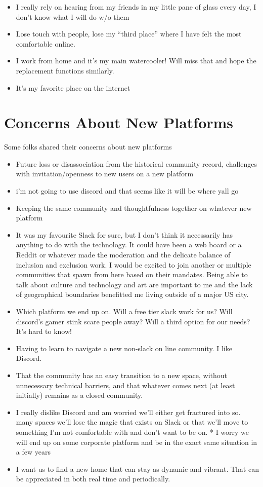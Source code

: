 \documentclass[
]{book}
\providecommand{\tightlist}{%
  \setlength{\itemsep}{0pt}\setlength{\parskip}{0pt}}
\begin{document}
\begin{itemize}
\tightlist
\item
  I really rely on hearing from my friends in my little pane of glass every day, I don't know what I will do w/o them
\item
  Lose touch with people, lose my ``third place'' where I have felt the most comfortable online.
\item
  I work from home and it's my main watercooler! Will miss that and hope the replacement functions similarly.
\item
  It's my favorite place on the internet
\end{itemize}

\section{Concerns About New Platforms}\label{concerns-about-new-platforms}

Some folks shared their concerns about new platforms

\begin{itemize}
\tightlist
\item
  Future loss or disassociation from the historical community record, challenges with invitation/openness to new users on a new platform
\item
  i'm not going to use discord and that seems like it will be where yall go
\item
  Keeping the same community and thoughtfulness together on whatever new platform
\item
  It was my favourite Slack for sure, but I don't think it necessarily has anything to do with the technology. It could have been a web board or a Reddit or whatever made the moderation and the delicate balance of inclusion and exclusion work. I would be excited to join another or multiple communities that spawn from here based on their mandates. Being able to talk about culture and technology and art are important to me and the lack of geographical boundaries benefitted me living outside of a major US city.
\item
  Which platform we end up on. Will a free tier slack work for us? Will discord's gamer stink scare people away? Will a third option for our needs? It's hard to know!
\item
  Having to learn to navigate a new non-slack on line community. I like Discord.
\item
  That the community has an easy transition to a new space, without unnecessary technical barriers, and that whatever comes next (at least initially) remains as a closed community.
\item
  I really dislike Discord and am worried we'll either get fractured into so. many spaces we'll lose the magic that exists on Slack or that we'll move to something I'm not comfortable with and don't want to be on. * I worry we will end up on some corporate platform and be in the exact same situation in a few years
\item
  I want us to find a new home that can stay as dynamic and vibrant. That can be appreciated in both real time and periodically.
\end{itemize}
\end{document}
